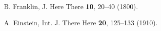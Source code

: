 \documentclass[prl,twocolumn]{revtex4-1}
\begin{document}
\begin{thebibliography}{99}

  B. Franklin,
  J. Here There {\bf 10}, 20--40 (1800).
  
  A. Einstein,
  Int. J. There Here {\bf 20}, 125--133 (1910).
  
\end{thebibliography}

\clearpage

\end{document}

